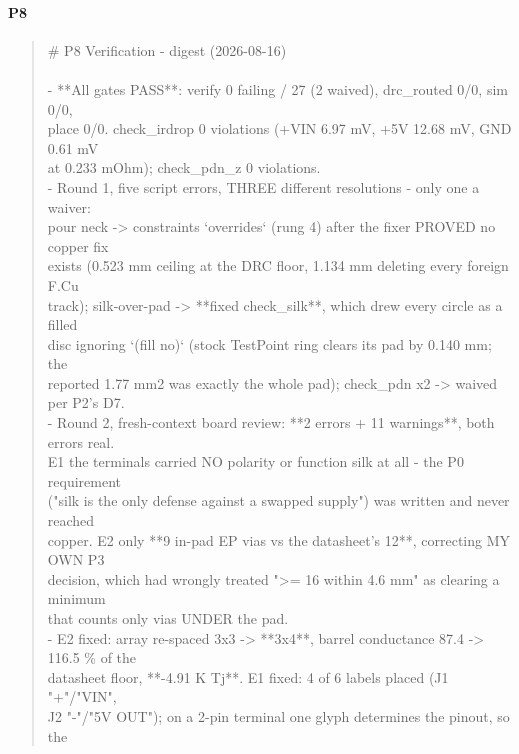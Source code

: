 \documentclass[11pt,a4paper]{article}
\begin{document}
\paragraph*{P8}
\begin{quote}\small\ttfamily\raggedright
\# P8 Verification - digest (2026-08-16)\\
~\\
- {*}{*}All gates PASS{*}{*}: verify 0 failing / 27 (2 waived), drc\_routed 0/0, sim 0/0,\\
  place 0/0. check\_irdrop 0 violations (+VIN 6.97 mV, +5V 12.68 mV, GND 0.61 mV\\
  at 0.233 mOhm); check\_pdn\_z 0 violations.\\
- Round 1, five script errors, THREE different resolutions - only one a waiver:\\
  pour neck -\textgreater{} constraints `overrides` (rung 4) after the fixer PROVED no copper fix\\
  exists (0.523 mm ceiling at the DRC floor, 1.134 mm deleting every foreign F.Cu\\
  track); silk-over-pad -\textgreater{} {*}{*}fixed check\_silk{*}{*}, which drew every circle as a filled\\
  disc ignoring `(fill no)` (stock TestPoint ring clears its pad by 0.140 mm; the\\
  reported 1.77 mm2 was exactly the whole pad); check\_pdn x2 -\textgreater{} waived per P2's D7.\\
- Round 2, fresh-context board review: {*}{*}2 errors + 11 warnings{*}{*}, both errors real.\\
  E1 the terminals carried NO polarity or function silk at all - the P0 requirement\\
  ("silk is the only defense against a swapped supply") was written and never reached\\
  copper. E2 only {*}{*}9 in-pad EP vias vs the datasheet's 12{*}{*}, correcting MY OWN P3\\
  decision, which had wrongly treated "\textgreater{}= 16 within 4.6 mm" as clearing a minimum\\
  that counts only vias UNDER the pad.\\
- E2 fixed: array re-spaced 3x3 -\textgreater{} {*}{*}3x4{*}{*}, barrel conductance 87.4 -\textgreater{} 116.5 \% of the\\
  datasheet floor, {*}{*}-4.91 K Tj{*}{*}. E1 fixed: 4 of 6 labels placed (J1 "+"/"VIN",\\
  J2 "-"/"5V OUT"); on a 2-pin terminal one glyph determines the pinout, so the\\

\end{quote}
\end{document}
